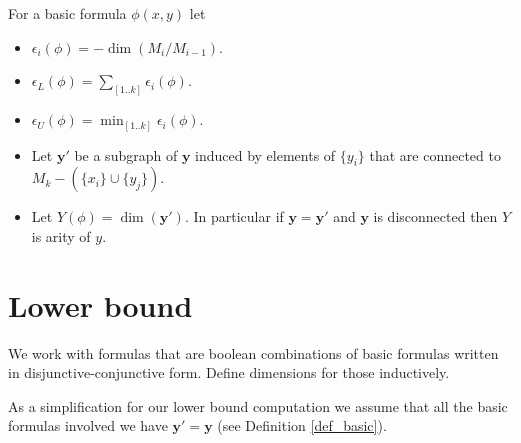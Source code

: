 \documentclass{amsart}
\newcommand{\paren}[1]{\left(#1\right)}
\begin{document}
\begin{Definition} \label{def_basic}
	For a basic formula $\phi(x, y)$ let
	\begin{itemize}
		\item $\epsilon_i(\phi) = -\dim \paren{M_i/M_{i-1}}$.
		\item $\epsilon_L(\phi) = \sum_{[1..k]} \epsilon_i(\phi)$.
		\item $\epsilon_U(\phi) = \min_{[1..k]} \epsilon_i(\phi)$.
		\item Let $\mathbf y'$ be a subgraph of $\mathbf y$ induced by elements of $\{y_i\}$ that are connected to $M_k - (\{x_i\} \cup \{y_j\})$.
		\item Let $Y(\phi) = \dim (\mathbf y')$.
		In particular if $\mathbf y = \mathbf y'$ and $\mathbf y$ is disconnected then $Y$ is arity of $y$.
	\end{itemize}
\end{Definition}


\section{Lower bound}

We work with formulas that are boolean combinations of basic formulas written in disjunctive-conjunctive form.
Define dimensions for those inductively.

As a simplification for our lower bound computation we assume that all the basic formulas involved we have $\mathbf y' = \mathbf y$ (see Definition \ref{def_basic}).
\end{document}
